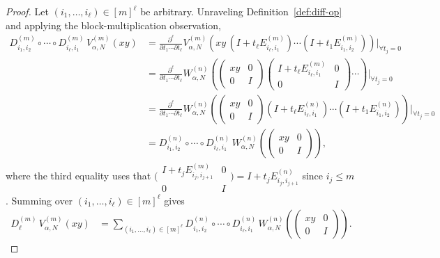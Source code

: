 \documentclass[12pt, reqno, oneside]{amsart}
\theoremstyle{definition}
\numberwithin{equation}{section}
\begin{document}
\begin{proof}
Let $(i_1,\ldots,i_\ell)\in[m]^\ell$ be arbitrary. Unraveling
Definition~\ref{def:diff-op} and applying the block-multiplication
observation,
\begin{align*}
  D_{i_1,i_2}^{(m)}\circ\cdots\circ D_{i_\ell,i_1}^{(m)}\,
  V_{\alpha,N}^{(m)}(xy)
  &= \frac{\partial^\ell}{\partial t_1\cdots\partial t_\ell}
    V_{\alpha,N}^{(m)}\!\left(
      xy\,(I+t_\ell E_{i_\ell,i_1}^{(m)})\cdots(I+t_1 E_{i_1,i_2}^{(m)})
    \right)\Bigg|_{\forall t_j=0} \\
  &= \frac{\partial^\ell}{\partial t_1\cdots\partial t_\ell}
    W_{\alpha,N}^{(n)}\!\left(
      \begin{pmatrix}xy&0\\0&I\end{pmatrix}
      \begin{pmatrix}I+t_\ell E_{i_\ell,i_1}^{(m)}&0\\0&I\end{pmatrix}
      \cdots
    \right)\Bigg|_{\forall t_j=0} \\
  &= \frac{\partial^\ell}{\partial t_1\cdots\partial t_\ell}
    W_{\alpha,N}^{(n)}\!\left(
      \begin{pmatrix}xy&0\\0&I\end{pmatrix}
      (I+t_\ell E_{i_\ell,i_1}^{(n)})\cdots(I+t_1 E_{i_1,i_2}^{(n)})
    \right)\Bigg|_{\forall t_j=0} \\
  &= D_{i_1,i_2}^{(n)}\circ\cdots\circ D_{i_\ell,i_1}^{(n)}\,
    W_{\alpha,N}^{(n)}\!\left(\begin{pmatrix}xy&0\\0&I\end{pmatrix}\right),
\end{align*}
where the third equality uses that $\bigl(\begin{smallmatrix}I+t_j
E_{i_j,i_{j+1}}^{(m)}&0\\0&I\end{smallmatrix}\bigr)=I+t_j
E_{i_j,i_{j+1}}^{(n)}$ since $i_j\leq m$. Summing over $(i_1,\ldots,i_\ell)\in[m]^\ell$ gives
\begin{align}
  D_\ell^{(m)}\,V_{\alpha,N}^{(m)}(xy)
  &= \sum_{(i_1,\ldots,i_\ell)\in[m]^\ell}
    D_{i_1,i_2}^{(n)}\circ\cdots\circ D_{i_\ell,i_1}^{(n)}\,
    W_{\alpha,N}^{(n)}\!\left(\begin{pmatrix}xy&0\\0&I\end{pmatrix}\right).
    \label{eq:casimir-reduction}
\end{align}

\end{proof}
\end{document}
